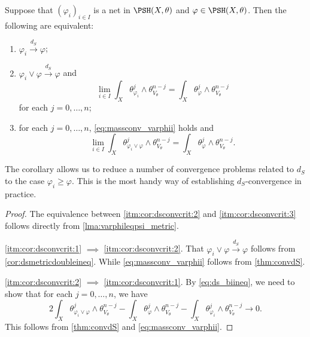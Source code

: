 \begin{corollary}\label{cor:dsconvcrit}
    Suppose that $(\varphi_i)_{i\in I}$ is a net in $\PSH(X,\theta)$ and $\varphi\in \PSH(X,\theta)$. Then the following are equivalent:
    \begin{enumerate}
        \item\label{itm:cor:dsconvcrit:1} $\varphi_i\xrightarrow{d_S}\varphi$;
        \item\label{itm:cor:dsconvcrit:2} $\varphi_i\lor \varphi\xrightarrow{d_S}\varphi$ and
        \begin{equation}\label{eq:massconv_varphii}
        \lim_{i\in I}\int_X \theta_{\varphi_i}^j\wedge \theta_{V_{\theta}}^{n-j}=\int_X \theta_{\varphi}^j\wedge \theta_{V_{\theta}}^{n-j}
        \end{equation}
        for each $j=0,\ldots,n$;
        \item\label{itm:cor:dsconvcrit:3} for each $j=0,\ldots,n$, \eqref{eq:massconv_varphii} holds and
        \begin{equation}\label{eq:massconv_varphii2}
        \lim_{i\in I}\int_X \theta_{\varphi_i\lor \varphi}^j\wedge \theta_{V_{\theta}}^{n-j}=\int_X \theta_{\varphi}^j\wedge \theta_{V_{\theta}}^{n-j}.
        \end{equation}
    \end{enumerate}
\end{corollary}
The corollary allows us to reduce a number of convergence problems related to $d_S$ to the case $\varphi_i\geq \varphi$.
This is the most handy way of establishing $d_S$-convergence in practice.
\begin{proof}
    The equivalence between \ref{itm:cor:dsconvcrit:2} and \ref{itm:cor:dsconvcrit:3} follows directly from \cref{lma:varphileqpsi_metric}.

    \ref{itm:cor:dsconvcrit:1} $\implies$ \ref{itm:cor:dsconvcrit:2}. That $\varphi_i\lor \varphi\xrightarrow{d_S}\varphi$ follows from \cref{cor:dsmetricdoubleineq}. While \eqref{eq:massconv_varphii} follows from \cref{thm:convdS}.

    \ref{itm:cor:dsconvcrit:2} $\implies$ \ref{itm:cor:dsconvcrit:1}. By \eqref{eq:ds_biineq}, we need to show that for each $j=0,\ldots,n$, we have
    \[
    2\int_X \theta_{\varphi_i\lor \varphi}^j\wedge \theta_{V_{\theta}}^{n-j}-\int_X \theta_{\varphi}^j\wedge \theta_{V_{\theta}}^{n-j}-\int_X \theta_{\varphi_i}^j\wedge \theta_{V_{\theta}}^{n-j}\to 0.
    \]
    This follows from \cref{thm:convdS} and \eqref{eq:massconv_varphii}.
\end{proof}


